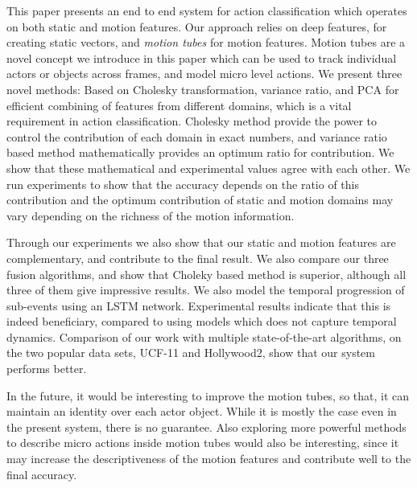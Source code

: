 This paper presents an end to end system for action classification which operates
on both static and motion features. Our approach relies on deep features,
for creating static vectors, and \textit{motion tubes} for motion features.
Motion tubes are a novel concept we introduce in this paper which can be
used to track individual actors or objects across frames, and model micro level actions.
We present three novel methods: Based on Cholesky transformation, variance ratio, and PCA for efficient combining of features
from different domains, which is a vital requirement in action classification.
Cholesky method provide the power to control the contribution of each domain in exact numbers, and
variance ratio based method mathematically provides an optimum ratio for contribution. We show that these mathematical
and experimental values agree with each other. We run experiments to show that the accuracy depends on the ratio of this contribution and the optimum contribution of
static and motion domains may vary depending on the richness of the motion information.

Through our experiments we also show that our static and motion features are complementary,
and contribute to the final result. We also compare our three fusion algorithms, and
show that Choleky based method is superior, although all three of them give impressive results. We also model the temporal progression of sub-events using an LSTM network. Experimental
results indicate that this is indeed beneficiary, compared to using models which does not capture temporal dynamics. Comparison of our work with multiple state-of-the-art algorithms, on the two popular data sets, UCF-11 and Hollywood2, show that our system performs better.


In the future, it would be interesting to improve the motion tubes, so that, it can maintain an identity over each actor object.
While it is mostly the case even in the present system, there is no guarantee. 
Also exploring more powerful methods to describe micro actions inside motion tubes would also be interesting, since it may increase the descriptiveness of the motion features and
contribute well to the final accuracy.
